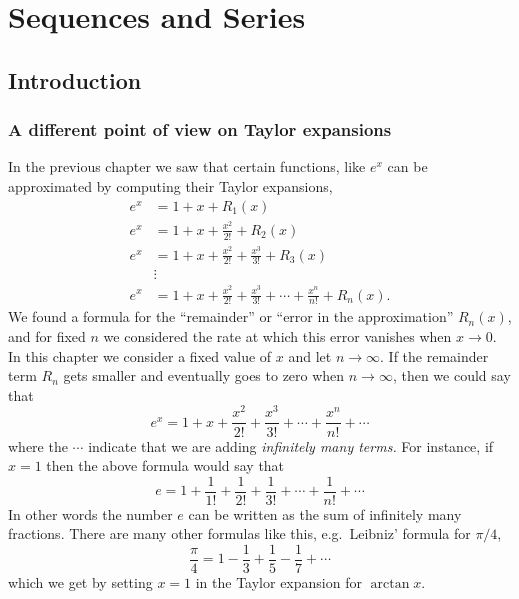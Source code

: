 \chapter{Sequences and Series}
\section{Introduction} %

\subsection{A different point of view on Taylor expansions} %
In the previous chapter we saw that certain functions, like $e^x$ can be
approximated by computing their Taylor expansions,
\begin{align*}
  e^x &= 1+x+R_1(x)\\
  e^x &= 1+x+ \frac{x^2}{2!} +R_2(x)\\
  e^x &= 1+x+ \frac{x^2}{2!} + \frac{x^3}{3!} +R_3(x)\\
  &\vdots\\
  e^x &= 1+x+ \frac{x^2}{2!} + \frac{x^3}{3!} + \cdots + \frac{x^n}{n!} + R_n(x).
\end{align*}
We found a formula for the ``remainder'' or ``error in the approximation''
$R_n(x)$, and for fixed $n$ we considered the rate at which this error vanishes
when $x\to0$.  In this chapter we consider a fixed value of $x$ and let
$n\to\infty$.  If the remainder term $R_n$ gets smaller and eventually goes to
zero when $n\to\infty$, then we could say that
\begin{equation}
  e^x = 1+x+ \frac{x^2}{2!} + \frac{x^3}{3!} + \cdots + \frac{x^n}{n!} + \cdots
  \label{eq:ex-series}
\end{equation}
where the $\cdots$ indicate that we are adding \emph{infinitely many terms.}
For instance, if $x=1$ then the above formula would say that 
\begin{equation}
  e = 1+\frac{1}{1!} + \frac{1}{2!} + \frac{1}{3!} + \cdots + \frac{1}{n!} + \cdots
  \label{eq:e1-series}
\end{equation}
In other words the number $e$ can be written as the sum of infinitely many
fractions.  There are many other formulas like this, e.g.~Leibniz' formula for
$\pi/4$,
\begin{equation}
  \frac{\pi}{4} = 1-\frac{1}{3} +\frac{1}{5}-\frac{1}{7}+\cdots
  \label{eq:pi-fourth-series}
\end{equation}
which we get by setting $x=1$ in the Taylor expansion for $\arctan x$.

